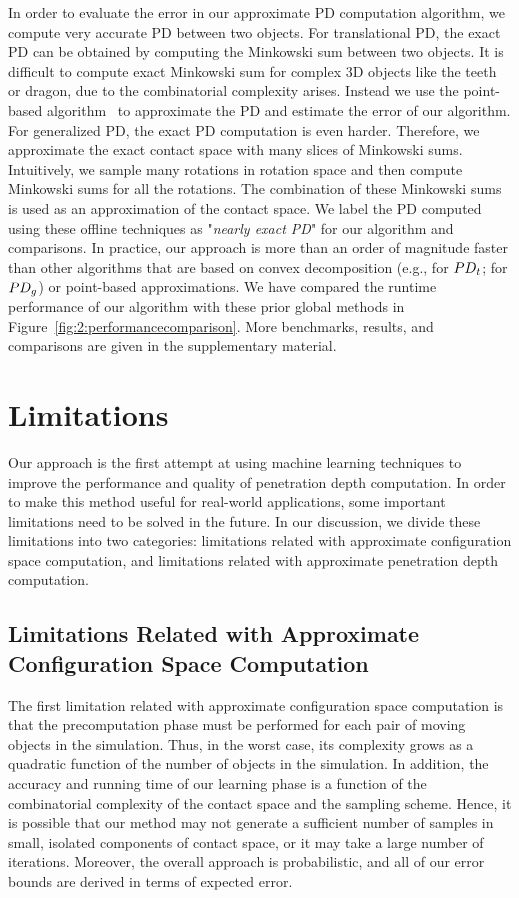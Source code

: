 In order to evaluate the error in our approximate PD computation algorithm, we compute very accurate PD between two objects. For translational PD, the exact PD can be obtained by computing the Minkowski sum between two objects. 
It is difficult to compute exact Minkowski sum for complex 3D objects like the teeth or dragon, due to the combinatorial complexity arises. Instead we use the point-based algorithm~\cite{Lien:2009:ASM} to approximate the PD and estimate the error of our algorithm.
For generalized PD, the exact PD computation is even harder. Therefore, we approximate the exact contact space with many slices of Minkowski sums. Intuitively, we sample many rotations in rotation space and then compute Minkowski sums for all the rotations. The combination of these Minkowski sums is used as an approximation of the contact space. We label the PD computed using these offline techniques as "\emph{nearly exact PD}" for our algorithm and comparisons.
In practice, our approach is more than an order of magnitude faster than other algorithms that are based on convex decomposition (e.g., \cite{Kim:2002:FPD} for $PD_t$; \cite{Zhang:2007:GPD} for $PD_g$) or point-based approximations. We have compared the runtime performance of our algorithm with these prior global methods in Figure~\ref{fig:2:performancecomparison}. More benchmarks, results, and comparisons are given in the supplementary material.


\section{Limitations}
\label{sec:2:limitations}
Our approach is the first attempt at using machine learning techniques to improve the performance and quality of penetration depth computation. In order to make this method useful for real-world applications, some important limitations need to be solved in the future. In our discussion, we divide these limitations into two categories: limitations related with approximate configuration space computation, and limitations related with approximate penetration depth computation.

\subsection{Limitations Related with Approximate Configuration Space Computation}
The first limitation related with approximate configuration space computation is that the precomputation phase must be performed for each pair of moving objects in the simulation. Thus, in the worst case, its complexity grows as a quadratic function of the number of objects in the simulation. In addition, the accuracy and running time of our learning phase is a function of the combinatorial complexity of the contact
space and the sampling scheme. Hence, it is possible that our method may not generate a sufficient number of samples in small,
isolated components of contact space, or it may take a large number of iterations.
Moreover, the overall approach is probabilistic, and all of our error bounds are derived in terms of expected error.

